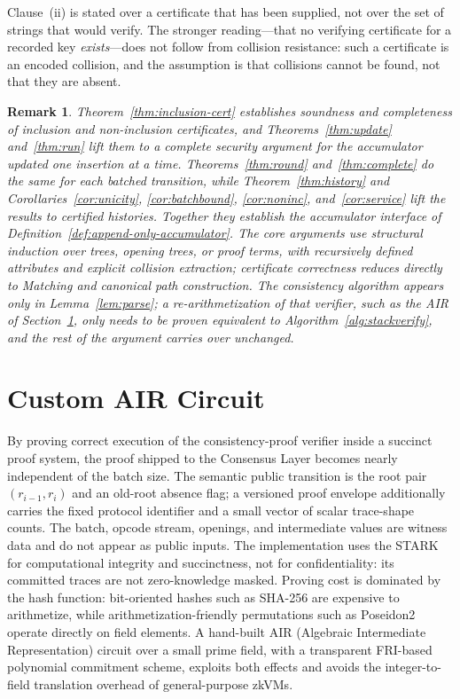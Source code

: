 \documentclass[11pt]{article}
\newtheorem{remark}{Remark}
\begin{document}
Clause~(ii) is stated over a certificate that has been supplied, not over the set of strings that would verify. The stronger reading---that no verifying certificate for a recorded key \emph{exists}---does not follow from collision resistance: such a certificate is an encoded collision, and the assumption is that collisions cannot be found, not that they are absent.

\begin{remark}
Theorem~\ref{thm:inclusion-cert} establishes soundness and completeness of inclusion and non-inclusion certificates, and Theorems~\ref{thm:update} and~\ref{thm:run} lift them to a complete security argument for the accumulator updated one insertion at a time. Theorems~\ref{thm:round} and~\ref{thm:complete} do the same for each batched transition, while Theorem~\ref{thm:history} and Corollaries~\ref{cor:unicity}, \ref{cor:batchbound}, \ref{cor:noninc}, and~\ref{cor:service} lift the results to certified histories. Together they establish the accumulator interface of Definition~\ref{def:append-only-accumulator}. The core arguments use structural induction over trees, opening trees, or proof terms, with recursively defined attributes and explicit collision extraction; certificate correctness reduces directly to Matching and canonical path construction. The consistency algorithm appears only in Lemma~\ref{lem:parse}; a re-arithmetization of that verifier, such as the AIR of Section~\ref{sec:custom-air-circuit}, only needs to be proven equivalent to Algorithm~\ref{alg:stackverify}, and the rest of the argument carries over unchanged.
\end{remark}


\section{Custom AIR Circuit}
\label{sec:custom-air-circuit}

By proving correct execution of the consistency-proof verifier inside a succinct proof system, the proof shipped to the Consensus Layer becomes nearly independent of the batch size. The semantic public transition is the root pair $(r_{i-1}, r_i)$ and an old-root absence flag; a versioned proof envelope additionally carries the fixed protocol identifier and a small vector of scalar trace-shape counts. The batch, opcode stream, openings, and intermediate values are witness data and do not appear as public inputs. The implementation uses the STARK for computational integrity and succinctness, not for confidentiality: its committed traces are not zero-knowledge masked. Proving cost is dominated by the hash function: bit-oriented hashes such as SHA-256 are expensive to arithmetize, while arithmetization-friendly permutations such as Poseidon2 operate directly on field elements. A hand-built AIR (Algebraic Intermediate Representation) circuit over a small prime field, with a transparent FRI-based polynomial commitment scheme, exploits both effects and avoids the integer-to-field translation overhead of general-purpose zkVMs.
\end{document}
